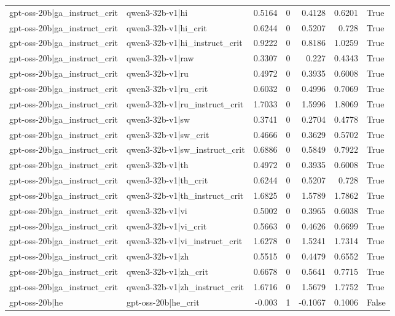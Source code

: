 \begin{table}
\begin{tabular}{l l r r r r l}
gpt-oss-20b|ga_instruct_crit & qwen3-32b-v1|hi & 0.5164 & 0 & 0.4128 & 0.6201 & True \\
gpt-oss-20b|ga_instruct_crit & qwen3-32b-v1|hi_crit & 0.6244 & 0 & 0.5207 & 0.728 & True \\
gpt-oss-20b|ga_instruct_crit & qwen3-32b-v1|hi_instruct_crit & 0.9222 & 0 & 0.8186 & 1.0259 & True \\
gpt-oss-20b|ga_instruct_crit & qwen3-32b-v1|raw & 0.3307 & 0 & 0.227 & 0.4343 & True \\
gpt-oss-20b|ga_instruct_crit & qwen3-32b-v1|ru & 0.4972 & 0 & 0.3935 & 0.6008 & True \\
gpt-oss-20b|ga_instruct_crit & qwen3-32b-v1|ru_crit & 0.6032 & 0 & 0.4996 & 0.7069 & True \\
gpt-oss-20b|ga_instruct_crit & qwen3-32b-v1|ru_instruct_crit & 1.7033 & 0 & 1.5996 & 1.8069 & True \\
gpt-oss-20b|ga_instruct_crit & qwen3-32b-v1|sw & 0.3741 & 0 & 0.2704 & 0.4778 & True \\
gpt-oss-20b|ga_instruct_crit & qwen3-32b-v1|sw_crit & 0.4666 & 0 & 0.3629 & 0.5702 & True \\
gpt-oss-20b|ga_instruct_crit & qwen3-32b-v1|sw_instruct_crit & 0.6886 & 0 & 0.5849 & 0.7922 & True \\
gpt-oss-20b|ga_instruct_crit & qwen3-32b-v1|th & 0.4972 & 0 & 0.3935 & 0.6008 & True \\
gpt-oss-20b|ga_instruct_crit & qwen3-32b-v1|th_crit & 0.6244 & 0 & 0.5207 & 0.728 & True \\
gpt-oss-20b|ga_instruct_crit & qwen3-32b-v1|th_instruct_crit & 1.6825 & 0 & 1.5789 & 1.7862 & True \\
gpt-oss-20b|ga_instruct_crit & qwen3-32b-v1|vi & 0.5002 & 0 & 0.3965 & 0.6038 & True \\
gpt-oss-20b|ga_instruct_crit & qwen3-32b-v1|vi_crit & 0.5663 & 0 & 0.4626 & 0.6699 & True \\
gpt-oss-20b|ga_instruct_crit & qwen3-32b-v1|vi_instruct_crit & 1.6278 & 0 & 1.5241 & 1.7314 & True \\
gpt-oss-20b|ga_instruct_crit & qwen3-32b-v1|zh & 0.5515 & 0 & 0.4479 & 0.6552 & True \\
gpt-oss-20b|ga_instruct_crit & qwen3-32b-v1|zh_crit & 0.6678 & 0 & 0.5641 & 0.7715 & True \\
gpt-oss-20b|ga_instruct_crit & qwen3-32b-v1|zh_instruct_crit & 1.6716 & 0 & 1.5679 & 1.7752 & True \\
gpt-oss-20b|he & gpt-oss-20b|he_crit & -0.003 & 1 & -0.1067 & 0.1006 & False \\

\end{tabular}
\end{table}
